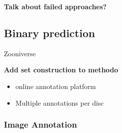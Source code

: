\documentclass[english]{article}
\begin{document}
\textbf{Talk about failed approaches?}

\subsection{Binary prediction}
Zooniverse \parencite{zooniverse}

\textbf{Add set construction to methodo}

\begin{itemize}
	\item online annotation platform
	\item Multiple annotations per disc
\end{itemize}

\subsubsection{Image Annotation}
\end{document}

